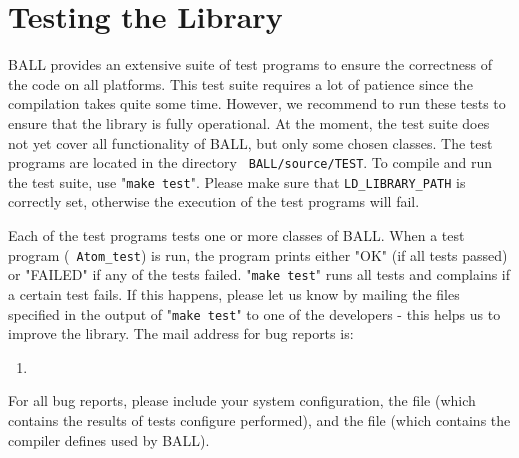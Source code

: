 \section{Testing the Library}

BALL provides an extensive suite of test programs to ensure the correctness of
the code on all platforms. This test suite requires a lot of patience since
the compilation takes quite some time. However, we recommend to run these
tests to ensure that the library is fully operational. At the moment, the test
suite does not yet cover all functionality of BALL, but only some chosen
classes.  The test programs are located in the directory {\tt
BALL/source/TEST}.  To compile and run the test suite, use "{\tt make test}".
Please make sure that {\tt LD\_LIBRARY\_PATH} is correctly set, otherwise the
execution of the test programs will fail.

Each of the test programs tests one or more classes of BALL. When a test
program (\eg~{\tt Atom\_test}) is run, the program prints either "OK" (if all
tests passed) or "FAILED" if any of the tests failed. "{\tt make test}" runs
all tests and complains if a certain test fails.  If this happens, please let
us know by mailing the files specified in the output of "{\tt make test}" to
one of the developers - this helps us to improve the library.  The mail
address for bug reports is:
\begin{enumerate}
	\item[] 
\end{enumerate}

\noindent
For all bug reports, please include your system configuration, the file
 (which contains the results of tests configure performed),
and the file  (which contains the compiler
defines used by BALL).

